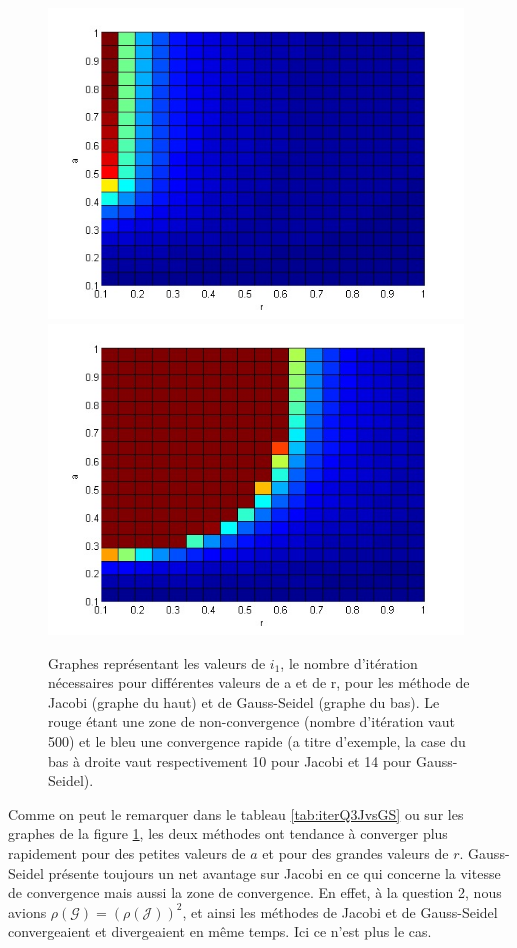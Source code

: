 \begin{figure}
  \centering
  \includegraphics[width=11cm]{convergence_JacobiQ3.png}
  \includegraphics[width=11cm]{convergence_GSQ3.png}
  \caption{Graphes représentant les valeurs de $i_1$, le nombre d'itération nécessaires  pour différentes valeurs de a et de r, pour les méthode de Jacobi (graphe du haut) et de Gauss-Seidel (graphe du bas). Le rouge étant une zone de non-convergence (nombre d'itération vaut 500) et le bleu une convergence rapide (a titre d'exemple, la case du bas à droite vaut respectivement 10 pour Jacobi et 14 pour Gauss-Seidel).}
  \label{fig:JvsGS}
\end{figure}

Comme on peut le remarquer dans le tableau \ref{tab:iterQ3JvsGS} ou sur les graphes de la figure \ref{fig:JvsGS}, les deux méthodes ont tendance à converger plus rapidement pour des petites valeurs de $a$ et pour des  grandes valeurs de $r$. Gauss-Seidel présente toujours un net avantage sur Jacobi en ce qui concerne la vitesse de convergence mais aussi la zone de convergence. En effet, à la question 2, nous avions $\rho (\mathcal{G}) = (\rho (\mathcal{J}))^2$, et ainsi les méthodes de Jacobi et de Gauss-Seidel convergeaient et divergeaient en même temps. Ici ce n'est plus le cas.



